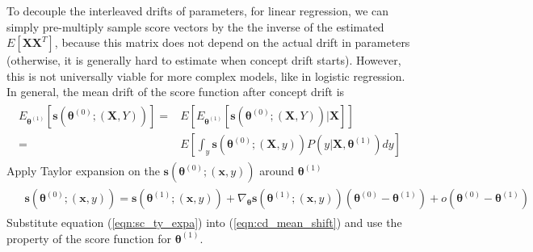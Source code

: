 \documentclass[twoside,11pt]{article}
\begin{document}
To decouple the interleaved drifts of parameters, for linear regression, we can simply pre-multiply sample score vectors by the {the inverse of the estimated} $E [\bm {X}\bm {X}^T]$, because this matrix does not depend on the actual drift in parameters (otherwise, it is generally hard to estimate when concept drift starts). However, this is not universally viable for more complex models, like in logistic regression. In general, the mean {drift} of the score function after concept drift is
\begin{align}
\begin{aligned}
E _{\bm { \theta}^{ (1)}}[\bm{s}(\bm { \theta}^{ (0)}; (\bm {X}, Y))] 
= & E[E _{\bm { \theta}^{ (1)}}[\bm{s}(\bm { \theta}^{ (0)}; (\bm {X}, Y))| \bm {X}] ] \\
= & E[\int _{y}\bm{s}(\bm { \theta}^{ (0)}; (\bm {X}, y)) P(y | \bm {X}, \bm{\theta} ^{ (1)}) dy ]
\end{aligned}
\label{eqn:cd_mean_shift}
\end{align}
Apply Taylor expansion on the $\bm{s}(\bm { \theta}^{ (0)}; (\bm {x}, y))$ around $\bm { \theta} ^{ (1)}$
\begin{align}
\begin{aligned}
 &\bm{s}(\bm { \theta}^{ (0)}; (\bm {x}, y)) = \bm{s}(\bm { \theta}^{ (1)}; (\bm {x}, y)) 
 + \nabla _{\bm { \theta}}{ \bm{s}(\bm { \theta}^{ (1)}; (\bm {x}, y))}(\bm { \theta}^ { (0)} - \bm { \theta} ^{ (1)}) 
 + o(\bm { \theta}^ { (0)} - \bm { \theta} ^{ (1)} ) 
\end{aligned}
\label{eqn:sc_ty_expa}
\end{align}
Substitute equation (\ref{eqn:sc_ty_expa}) into (\ref{eqn:cd_mean_shift}) and use the property of the score function for $\bm { \theta} ^{ (1)}$.
\end{document}
